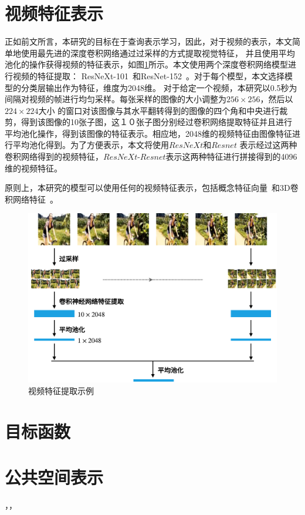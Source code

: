 \section{视频特征表示}
正如前文所言，本研究的目标在于查询表示学习，因此，对于视频的表示，本文简单地使用最先进的深度卷积网络通过过采样的方式提取视觉特征，
并且使用平均池化的操作获得视频的特征表示，如图\ref{fig:video-cnn-feat}所示。本文使用两个深度卷积网络模型进行视频的特征提取：
ResNeXt-101~\cite{xie2017aggregated}和ResNet-152~\cite{he2016deep}。对于每个模型，本文选择模型的分类层输出作为特征，维度为2048维。
对于给定一个视频，本研究以0.5秒为间隔对视频的帧进行均匀采样。每张采样的图像的大小调整为$256\times256$，然后以$224\times224$大小
的窗口对该图像与其水平翻转得到的图像的四个角和中央进行裁剪，得到该图像的10张子图，这１０张子图分别经过卷积网络提取特征并且进行
平均池化操作，得到该图像的特征表示。相应地，2048维的视频特征由图像特征进行平均池化得到。为了方便表示，本文将使用$ResNeXt$和$Resnet$
表示经过这两种卷积网络得到的视频特征，$ResNeXt$-$Resnet$表示这两种特征进行拼接得到的4096维的视频特征。

原则上，本研究的模型可以使用任何的视频特征表示，包括概念特征向量~\cite{markatopoulou2017query,lu2016event,merler2012semantic}和3D卷积网络特征~\cite{mithun2018learning}。

\begin{figure}[tbh!]
    \centering
    \includegraphics[width=\linewidth]{figures/video-cnn-feat}
    \caption[视频特征提取示例]{视频特征提取示例}
    \label{fig:video-cnn-feat}
\end{figure}


\section{目标函数}




\section{公共空间表示}



，，
